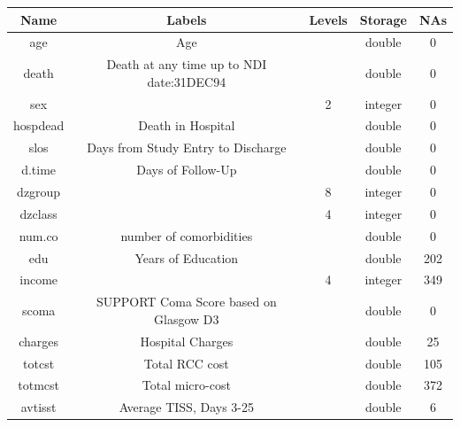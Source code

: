 \documentclass[
]{jss}
\begin{document}
\begin{table}[ht]
\centering
\begin{tabular}{ccccc}
\hline
\textbf{Name} & \textbf{Labels}                          & \textbf{Levels} & \textbf{Storage} & \textbf{NAs} \\
\hline
age           & Age                                      &                 & double           & 0            \\
death         & Death at any time up to NDI date:31DEC94 &                 & double           & 0            \\
sex           &                                          & 2               & integer          & 0            \\
hospdead      & Death in Hospital                        &                 & double           & 0            \\
slos          & Days from Study Entry to Discharge       &                 & double           & 0            \\
d.time        & Days of Follow-Up                        &                 & double           & 0            \\
dzgroup       &                                          & 8               & integer          & 0            \\
dzclass       &                                          & 4               & integer          & 0            \\
num.co        & number of comorbidities                  &                 & double           & 0            \\
edu           & Years of Education                       &                 & double           & 202          \\
income        &                                          & 4               & integer          & 349          \\
scoma         & SUPPORT Coma Score based on Glasgow D3   &                 & double           & 0            \\
charges       & Hospital Charges                         &                 & double           & 25           \\
totcst        & Total RCC cost                           &                 & double           & 105          \\
totmcst       & Total micro-cost                         &                 & double           & 372          \\
avtisst       & Average TISS, Days 3-25                  &                 & double           & 6            \\

\end{tabular}
\end{table}
\end{document}
